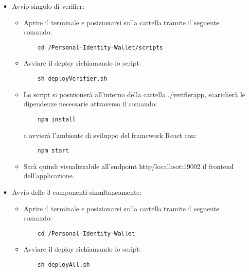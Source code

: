 \begin{itemize}
\item Avvio singolo di verifier:
\begin{itemize}
\item Aprire il terminale e posizionarsi sulla cartella tramite il seguente comando: 
\begin{verbatim}
    cd /Personal-Identity-Wallet/scripts
\end{verbatim}
\item Avviare il deploy richiamando lo script: 
\begin{verbatim}
    sh deployVerifier.sh
\end{verbatim}
\item Lo script si posizionerà all'interno della cartella ./verifierapp, scaricherà le dipendenze necessarie attraverso il comando: 
\begin{verbatim}
    npm install
\end{verbatim}
 e avvierà l’ambiente di sviluppo del framework React con:
\begin{verbatim}
    npm start
\end{verbatim}

\item Sarà quindi visualizzabile all'endpoint http/localhsot:19002 il frontend dell'applicazione.
\end{itemize}

\item Avvio delle 3 componenti simultaneamente:
\begin{itemize}
\item Aprire il terminale e posizionarsi sulla cartella tramite il seguente comando: 
\begin{verbatim}
    cd /Personal-Identity-Wallet
\end{verbatim}
\item Avviare il deploy richiamando lo script: 
\begin{verbatim}
    sh deployAll.sh
\end{verbatim}
\end{itemize}
\end{itemize}

